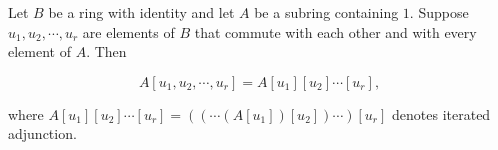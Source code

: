 Let $B$ be a ring with identity and let $A$ be a subring containing $1$. Suppose $u_1, u_2, \cdots, u_r$ are elements of $B$ that commute with each other and with every element of $A$. Then

$$A[u_1, u_2, \cdots, u_r] = A[u_1][u_2] \cdots [u_r],$$

where $A[u_1][u_2] \cdots [u_r] = ((\cdots(A[u_1])[u_2])\cdots)[u_r]$ denotes iterated adjunction.
